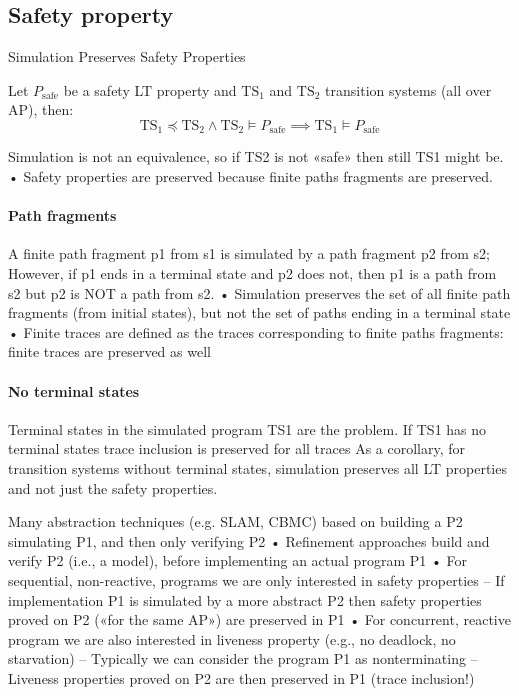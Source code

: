 \subsection{Safety property}
Simulation Preserves Safety Properties
\begin{property}
    Let $P_{\text{safe}}$ be a safety LT property and $\text{TS}_1$ and $\text{TS}_2$ transition systems (all over AP), then: 
    \[\text{TS}_1\preceq \text{TS}_2\land\text{TS}_2\models P_{\text{safe}}\implies\text{TS}_1\models P_{\text{safe}} \]
\end{property}
Simulation is not an equivalence, so if TS2 is not «safe» then still TS1 might be.
• Safety properties are preserved because finite paths fragments are preserved.

\paragraph*{Path fragments}
A finite path fragment p1 from s1 is simulated by a path fragment p2 from s2;
However, if p1 ends in a terminal state and p2 does not, then p1 is a path from s2 but p2 is NOT a path from s2.
• Simulation preserves the set of all finite path fragments (from initial states), but not the set of paths ending in a
terminal state
• Finite traces are defined as the traces corresponding to finite paths fragments: finite traces are preserved as well

\paragraph*{No terminal states}
Terminal states in the simulated program TS1 are the problem. If TS1 has no
terminal states trace inclusion is preserved for all traces
As a corollary, for transition systems without terminal states, simulation
preserves all LT properties and not just the safety properties.

Many abstraction techniques (e.g. SLAM, CBMC) based on building a P2
simulating P1, and then only verifying P2
• Refinement approaches build and verify P2 (i.e., a model), before implementing
an actual program P1
• For sequential, non-reactive, programs we are only interested in safety properties
– If implementation P1 is simulated by a more abstract P2 then safety properties proved on
P2 («for the same AP») are preserved in P1
• For concurrent, reactive program we are also interested in liveness property (e.g.,
no deadlock, no starvation)
– Typically we can consider the program P1 as nonterminating
– Liveness properties proved on P2 are then preserved in P1 (trace inclusion!) 

